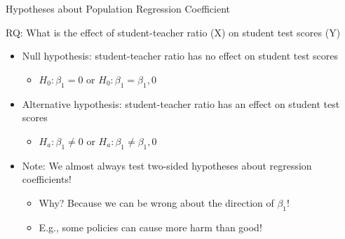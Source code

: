 \documentclass[
  8pt,
  ignorenonframetext,
  dvipsnames]{beamer}
\providecommand{\tightlist}{%
  \setlength{\itemsep}{0pt}\setlength{\parskip}{0pt}}
\let\olditem\item
\renewcommand{\item}{%
  \olditem\vspace{4pt}
}
\begin{document}
\begin{frame}{Hypotheses about Population Regression Coefficient}
\protect\hypertarget{hypotheses-about-population-regression-coefficient}{}

RQ: What is the effect of student-teacher ratio (X) on student test
scores (Y)

\begin{itemize}
\tightlist
\item
  Null hypothesis: student-teacher ratio has no effect on student test
  scores

  \begin{itemize}
  \tightlist
  \item
    \(H_0: \beta_1 = 0\) or \(H_0: \beta_1 = \beta_1,0\)
  \end{itemize}
\item
  Alternative hypothesis: student-teacher ratio has an effect on student
  test scores

  \begin{itemize}
  \tightlist
  \item
    \(H_a: \beta_1 \ne 0\) or \(H_a: \beta_1 \ne \beta_1,0\)
  \end{itemize}
\end{itemize}

\medskip

\begin{itemize}
\item
  Note: We almost always test two-sided hypotheses about regression
  coefficients!

  \begin{itemize}
  \tightlist
  \item
    Why? Because we can be wrong about the direction of \(\beta_1\)!
  \item
    E.g., some policies can cause more harm than good!
  \end{itemize}
\end{itemize}

\end{frame}
\end{document}
